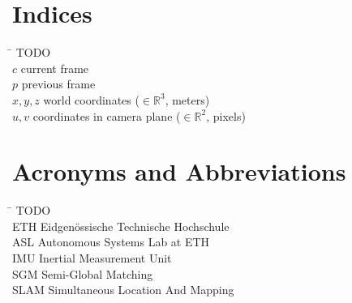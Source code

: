 \section*{Indices}
\begin{tabbing}
 \hspace*{1.6cm}  \= \kill
 TODO \\
 $c$ \> current frame \\[0.5ex]
 $p$ \> previous frame \\[0.5ex]
 $x, y, z$ \> world coordinates ($\in \mathbb{R}^3$, \unit{meters}) \\[0.5ex]
 $u, v$ \> coordinates in camera plane ($\in \mathbb{R}^2$, \unit{pixels}) \\[0.5ex]

\end{tabbing}

\section*{Acronyms and Abbreviations}
\begin{tabbing}
 \hspace*{1.6cm}  \= \kill
 TODO \\
 ETH \> Eidgenössische Technische Hochschule \\[0.5ex]
 ASL \> Autonomous Systems Lab at ETH \\[0.5ex]
 IMU \> Inertial Measurement Unit \\[0.5ex]
 SGM \> Semi-Global Matching \\[0.5ex]
 SLAM \> Simultaneous Location And Mapping \\[0.5ex]
\end{tabbing}
